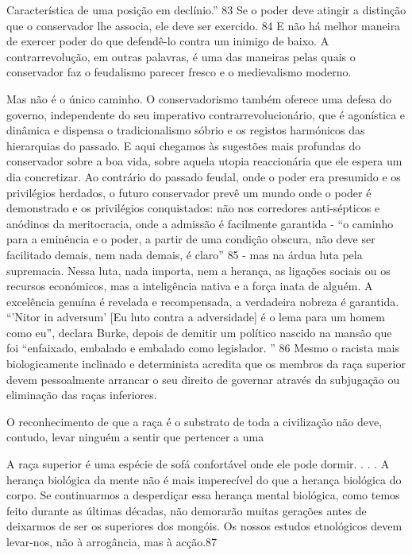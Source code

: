  \par 
Característica de uma posição em declínio.” {\color{blue}83} Se o poder deve atingir a distinção que o conservador lhe associa, ele deve ser exercido. {\color{blue}84} E não há melhor maneira de exercer poder do que defendê-lo contra um inimigo de baixo. A contrarrevolução, em outras palavras, é uma das maneiras pelas quais o conservador faz o feudalismo parecer fresco e o medievalismo moderno.
 \par 
Mas não é o único caminho. O conservadorismo também oferece uma defesa do governo, independente do seu imperativo contrarrevolucionário, que é agonística e dinâmica e dispensa o tradicionalismo sóbrio e os registos harmónicos das hierarquias do passado. E aqui chegamos às sugestões mais profundas do conservador sobre a boa vida, sobre aquela utopia reaccionária que ele espera um dia concretizar. Ao contrário do passado feudal, onde o poder era presumido e os privilégios herdados, o futuro conservador prevê um mundo onde o poder é demonstrado e os privilégios conquistados: não nos corredores anti-sépticos e anódinos da meritocracia, onde a admissão é facilmente garantida - “o caminho para a eminência e o poder, a partir de uma condição obscura, não deve ser facilitado demais, nem nada demais, é claro” {\color{blue}85} - mas na árdua luta pela supremacia. Nessa luta, nada importa, nem a herança, as ligações sociais ou os recursos económicos, mas a inteligência nativa e a força inata de alguém. A excelência genuína é revelada e recompensada, a verdadeira nobreza é garantida. “'Nitor in adversum' [Eu luto contra a adversidade] é o lema para um homem como eu”, declara Burke, depois de demitir um político nascido na mansão que foi “enfaixado, embalado e embalado como legislador. ” {\color{blue}86} Mesmo o racista mais biologicamente inclinado e determinista acredita que os membros da raça superior devem pessoalmente arrancar o seu direito de governar através da subjugação ou eliminação das raças inferiores.
 \par 
O reconhecimento de que a raça é o substrato de toda a civilização não deve, contudo, levar ninguém a sentir que pertencer a uma
 \par 
A raça superior é uma espécie de sofá confortável onde ele pode dormir. . . . A herança biológica da mente não é mais imperecível do que a herança biológica do corpo. Se continuarmos a desperdiçar essa herança mental biológica, como temos feito durante as últimas décadas, não demorarão muitas gerações antes de deixarmos de ser os superiores dos mongóis. Os nossos estudos etnológicos devem levar-nos, não à arrogância, mas à acção.{\color{blue}87}
